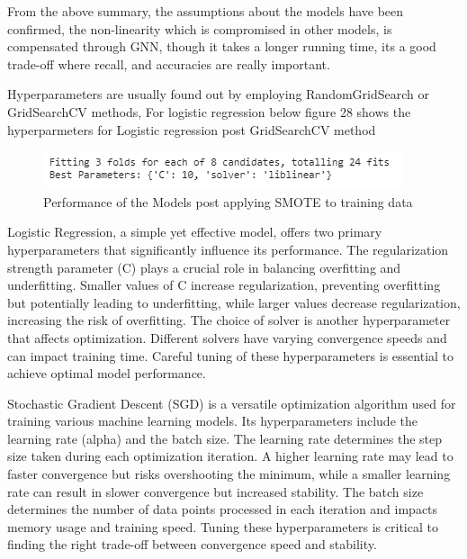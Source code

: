 \documentclass[journal,transmag]{J-NaNA}
\begin{document}
From the above summary, the assumptions about the models have been confirmed, the non-linearity which is compromised in other models, is compensated through GNN, though it takes a longer running time, its a good trade-off where recall, and accuracies are really important. 

Hyperparameters are usually found out by employing RandomGridSearch or GridSearchCV methods, For logistic regression below figure 28 shows the hyperparmeters for Logistic regression post GridSearchCV method

\begin{figure}[htbp]
\centering
\includegraphics[width=\linewidth]{logistic regression-hyperparameters.PNG} 
\caption{Performance of the Models post applying SMOTE to training data} 
\label{fig: Performance Metrics} %
\end{figure}

Logistic Regression, a simple yet effective model, offers two primary hyperparameters that significantly influence its performance. The regularization strength parameter (C) plays a crucial role in balancing overfitting and underfitting. Smaller values of C increase regularization, preventing overfitting but potentially leading to underfitting, while larger values decrease regularization, increasing the risk of overfitting. The choice of solver is another hyperparameter that affects optimization. Different solvers have varying convergence speeds and can impact training time. Careful tuning of these hyperparameters is essential to achieve optimal model performance.

Stochastic Gradient Descent (SGD) is a versatile optimization algorithm used for training various machine learning models. Its hyperparameters include the learning rate (alpha) and the batch size. The learning rate determines the step size taken during each optimization iteration. A higher learning rate may lead to faster convergence but risks overshooting the minimum, while a smaller learning rate can result in slower convergence but increased stability. The batch size determines the number of data points processed in each iteration and impacts memory usage and training speed. Tuning these hyperparameters is critical to finding the right trade-off between convergence speed and stability.
\end{document}
